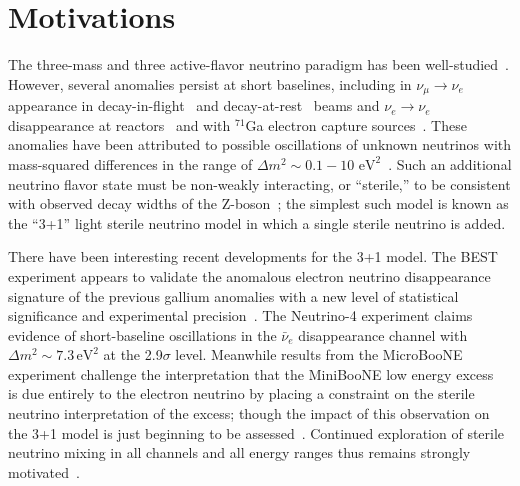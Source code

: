 \documentclass[main.tex]{subfiles}
\begin{document}
\section{\label{sec:one}Motivations}


The three-mass and three active-flavor neutrino paradigm has been well-studied~\cite{PhysRevD.98.030001,Esteban_2019,de_Salas_2018,Capozzi_2016,zboson2006, berns2021recent}.
However, several anomalies persist at short baselines, including in $\nu_\mu\rightarrow\nu_e $ appearance in decay-in-flight~\cite{aguilar2018significant} and decay-at-rest~\cite{Athanassopoulos_1998} beams  and $\nu_e\rightarrow\nu_e$ disappearance at reactors~\cite{mention2011reactor,serebrov2019first}  and with $^{71}$Ga electron capture sources~\cite{PhysRevC.73.045805,giunti2011statistical}.  These anomalies have been attributed to possible oscillations of unknown neutrinos with mass-squared differences in the range of $\Delta m^{2}\sim 0.1-10\text{ eV}^{2}$~\cite{abazajian2012light}.   Such an additional neutrino flavor state must be non-weakly interacting, or ``sterile,'' to be consistent with observed decay widths of the Z-boson~\cite{zboson2006}; the simplest such model is known as the ``3+1'' light sterile neutrino model in which a single sterile neutrino is added. 

There have been interesting recent developments for the 3+1 model.  The BEST experiment appears to validate the anomalous electron neutrino disappearance signature of the previous gallium anomalies with a new level of statistical significance and experimental precision~\cite{barinov2021results}. The Neutrino-4 experiment claims evidence of short-baseline oscillations in the $\bar{\nu}_e$ disappearance channel with $\Delta m^2\sim 7.3\,\mathrm{eV}^2$ at the 2.9$\sigma$ level. Meanwhile results from the MicroBooNE~\cite{microboonecollaboration2021search,microboonecollaboration2021search1,microboonecollaboration2021searchmulti} experiment challenge the interpretation that the MiniBooNE low energy excess~\cite{miniboone2018} is due entirely to the electron neutrino by placing a constraint on the sterile neutrino interpretation of the excess; though the impact of this observation on the 3+1 model is just beginning to be assessed~\cite{arguelles2021microboone,denton2021sterile}.  Continued exploration of sterile neutrino mixing in all channels and all energy ranges thus remains strongly motivated~\cite{sbnfermilab}.
\end{document}
